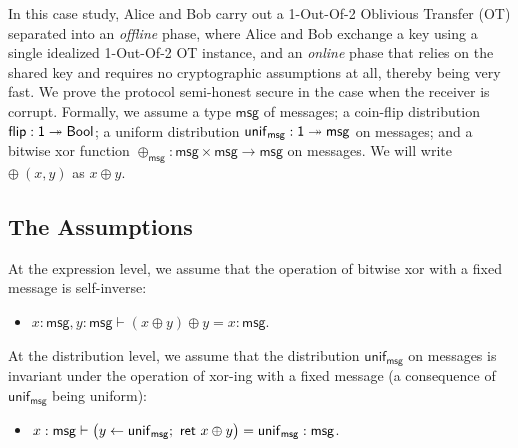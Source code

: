 \renewcommand{\msg}{\mathsf{msg}}
\newcommand{\flip}{\mathsf{flip}}
\renewcommand{\unif}{\mathsf{unif}}
\renewcommand{\id}{\mathsf{id}}
\renewcommand{\adv}{\mathsf{adv}}
\newcommand{\sen}{\mathsf{sen}}
\renewcommand{\rec}{\mathsf{rec}}
\newcommand{\ot}{\mathsf{ot}}
\renewcommand{\Msg}{\mathsf{Msg}}
\renewcommand{\Out}{\mathsf{Out}}
\newcommand{\Chc}{\mathsf{Chc}}
\newcommand{\OTMsg}{\mathsf{OTMsg}}
\newcommand{\OTOut}{\mathsf{OTOut}}
\newcommand{\OTChc}{\mathsf{OTChc}}
\newcommand{\Flip}{\mathsf{Flip}}
\renewcommand{\Key}{\mathsf{Key}}
\newcommand{\ChcEnc}{\mathsf{ChcEnc}}
\newcommand{\MsgEnc}{\mathsf{MsgEnc}}
\newcommand{\KeyPair}{\mathsf{KeyPair}}
\newcommand{\PrivMsg}{\mathsf{PrivMsg}}
\renewcommand{\LeakMsgRcvd}{\mathsf{MsgRcvd}}
\newcommand{\LeakOTMsgRcvd}{\mathsf{OTMsgRcvd}}
\newcommand{\LeakChc}{\mathsf{Chc}}
\newcommand{\LeakOTChc}{\mathsf{OTChc}}
\newcommand{\LeakFlip}{\mathsf{Flip}}
\newcommand{\LeakOut}{\mathsf{Out}}
\newcommand{\LeakOTOut}{\mathsf{OTOut}}
\newcommand{\LeakChcEnc}{\mathsf{ChcEnc}}
\newcommand{\LeakMsgEnc}{\mathsf{MsgEnc}}

In this case study, Alice and Bob carry out a 1-Out-Of-2 Oblivious Transfer (OT) separated into an \emph{offline} phase, where Alice and Bob exchange a key using a single idealized 1-Out-Of-2 OT instance, and an \emph{online} phase that relies on the shared key and requires no cryptographic assumptions at all, thereby being very fast. We prove the protocol semi-honest secure in the case when the receiver is corrupt. Formally, we assume a type $\msg$ of messages; a coin-flip distribution $\flip : \one \twoheadrightarrow \Bool$; a uniform distribution $\unif_\msg : \one \twoheadrightarrow \msg$ on messages; and a bitwise xor function $\oplus_{\msg} : \msg \times \msg \rightarrow \msg$ on messages. We will write $\oplus \ (x,y)$ as $x \oplus y$.

\subsection{The Assumptions}
At the expression level, we assume that the operation of bitwise xor with a fixed message is self-inverse:
\begin{itemize}
\item $x : \msg, y : \msg \vdash (x \oplus y) \oplus y = x : \msg$.
\end{itemize}
At the distribution level, we assume that the distribution $\unif_\msg$ on messages is invariant under the operation of xor-ing with a fixed message (a consequence of $\unif_\msg$ being uniform):
\begin{itemize}
\item $x : \msg \vdash \big(y \leftarrow \unif_\msg; \ \ret{x \oplus y}\big) = \unif_\msg : \msg$.
\end{itemize}

